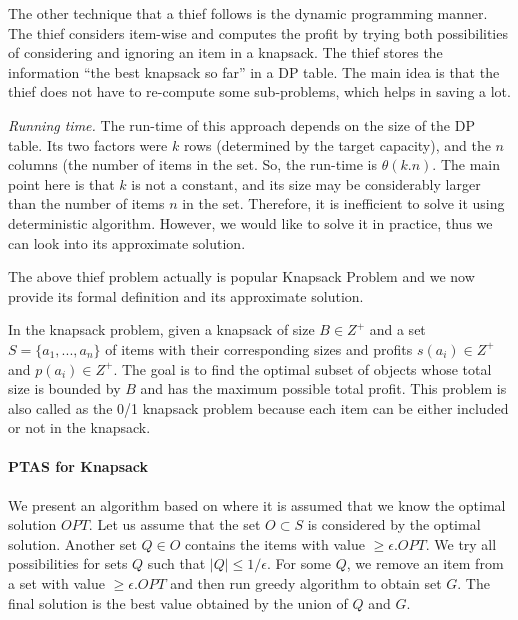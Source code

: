 The other technique that a thief follows is the dynamic programming manner. 
The thief considers item-wise and computes the profit by trying both possibilities of considering and ignoring an item in a knapsack.
The thief stores the information ``the best knapsack so far'' in a DP table.
The main idea is that the thief does not have to re-compute some sub-problems, which helps in saving a lot.


\textit{Running time.} The run-time of this approach depends on the size of the DP table. 
Its two factors were $k$ rows (determined by the target capacity), and the $n$ columns (the number of items in the set. So, the run-time is $\theta(k.n)$. 
The main point here is that $k$ is not a constant, and its size may be considerably larger than the number of items $n$ in the set. Therefore, it is inefficient to solve it using deterministic algorithm.
However, we would like to solve it in practice, thus we can look into its approximate solution.

The above thief problem actually is popular Knapsack Problem and we now provide its formal definition and its approximate solution.

In the knapsack problem, given a knapsack of size $B \in Z^+$ and a set $S = \{a_1, . . . , a_n\}$
of items with their corresponding sizes and profits $s(a_i) \in Z^+$ and $p(a_i) \in Z^+$. The goal is to find
the optimal subset of objects whose total size is bounded by $B$ and has the maximum possible
total profit. This problem is also called as the 0/1 knapsack problem because each
item can be either included or not in the knapsack. 

\paragraph{PTAS for Knapsack}
We present an algorithm based on \cite{lawler1979fast} where it is assumed that we know the optimal solution $OPT$.
Let us assume that the set $O \subset S$ is considered by the optimal solution.
Another set $Q \in O$ contains the items with value $\ge \epsilon. OPT$.
We try all possibilities for sets $Q$ such that $|Q| \le 1/\epsilon$.
For some $Q$, we remove an item from a set with value $\ge \epsilon.OPT$ and then run greedy algorithm to obtain set $G$.
The final solution is the best value obtained by the union of $Q$ and $G$.

